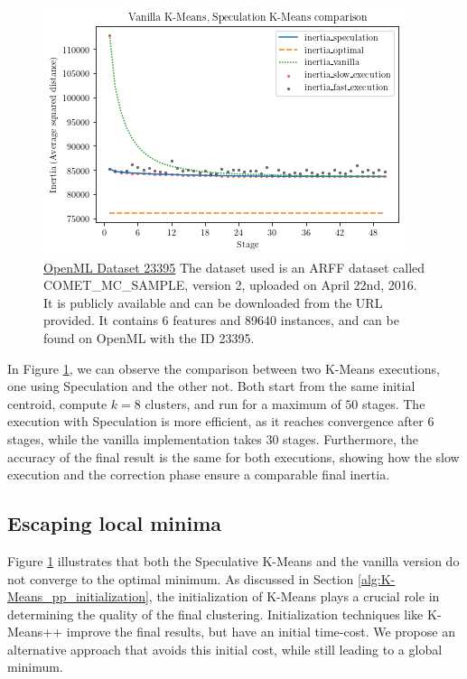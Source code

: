 \begin{figure}[ht]
\centering
\includegraphics[width=\linewidth]{./plots/vanilla_speculation_comparison.png}
\caption{\href{https://www.openml.org/d/23395}{OpenML Dataset 23395} The dataset used is an ARFF dataset called COMET\_MC\_SAMPLE, version 2, uploaded on April 22nd, 2016. It is publicly available and can be downloaded from the URL provided. It contains 6 features and 89640 instances, and can be found on OpenML with the ID 23395.}
\label{fig:vanilla_speculation_comparison}
\end{figure}
In Figure \ref{fig:vanilla_speculation_comparison}, we can observe the comparison between two K-Means executions, one using Speculation and the other not. Both start from the same initial centroid, compute $k=8$ clusters, and run for a maximum of $50$ stages.
The execution with Speculation is more efficient, as it reaches convergence after 6 stages, while the vanilla implementation takes 30 stages. Furthermore, the accuracy of the final result is the same for both executions, showing how the slow execution and the correction phase ensure a comparable final inertia.


\subsection{Escaping local minima}
\label{section:escaping_local_minima}
Figure \ref{fig:vanilla_speculation_comparison} illustrates that both the Speculative K-Means and the vanilla version do not converge to the optimal minimum. As discussed in Section \ref{alg:K-Means_pp_initialization}, the initialization of K-Means plays a crucial role in determining the quality of the final clustering. Initialization techniques like K-Means++ improve the final results, but have an initial time-cost. We propose an alternative approach that avoids this initial cost, while still leading to a global minimum.

